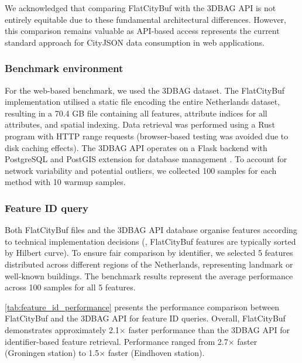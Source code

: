 We acknowledged that comparing FlatCityBuf with the 3DBAG API is not entirely equitable due to these fundamental architectural differences. However, this comparison remains valuable as API-based access represents the current standard approach for CityJSON data consumption in web applications.

\subsubsection{Benchmark environment}
\label{result:benchmark_over_the_web:benchmark_environment}

For the web-based benchmark, we used the 3DBAG dataset. The FlatCityBuf implementation utilised a static file encoding the entire Netherlands dataset, resulting in a 70.4 GB file containing all features, attribute indices for all attributes, and spatial indexing. Data retrieval was performed using a Rust program with HTTP range requests (browser-based testing was avoided due to disk caching effects). The 3DBAG API operates on a Flask backend with PostgreSQL and PostGIS extension for database management \citep{powalka_2023}. To account for network variability and potential outliers, we collected 100 samples for each method with 10 warmup samples.

\subsubsection{Feature ID query}
\label{result:benchmark_over_the_web:feature_id_query}

Both FlatCityBuf files and the 3DBAG API database organise features according to technical implementation decisions (\eg, FlatCityBuf features are typically sorted by Hilbert curve). To ensure fair comparison by identifier, we selected 5 features distributed across different regions of the Netherlands, representing landmark or well-known buildings. The benchmark results represent the average performance across 100 samples for all 5 features.

\autoref{tab:feature_id_performance} presents the performance comparison between FlatCityBuf and the 3DBAG API for feature ID queries. Overall, FlatCityBuf demonstrates approximately 2.1$\times$ faster performance than the 3DBAG API for identifier-based feature retrieval. Performance ranged from 2.7$\times$ faster (Groningen station) to 1.5$\times$ faster (Eindhoven station).

